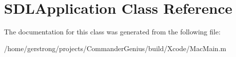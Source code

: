 \hypertarget{interface_s_d_l_application}{
\section{SDLApplication Class Reference}
\label{interface_s_d_l_application}
}


The documentation for this class was generated from the following file:\begin{DoxyCompactItemize}
\item 
/home/gerstrong/projects/CommanderGenius/build/Xcode/MacMain.m\end{DoxyCompactItemize}
